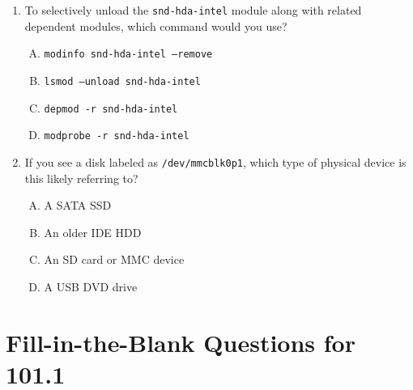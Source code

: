 \documentclass[a4paper]{report}
\begin{document}
\begin{enumerate}[1.]
\item To selectively unload the \texttt{snd-hda-intel} module along with related dependent modules, which command would you use?
  \begin{enumerate}[A)]
    \item \texttt{modinfo snd-hda-intel --remove}
    \item \texttt{lsmod --unload snd-hda-intel}
    \item \texttt{depmod -r snd-hda-intel}
    \item \texttt{modprobe -r snd-hda-intel}
  \end{enumerate}

\item If you see a disk labeled as \texttt{/dev/mmcblk0p1}, which type of physical device is this likely referring to?
  \begin{enumerate}[A)]
    \item A SATA SSD
    \item An older IDE HDD
    \item An SD card or MMC device
    \item A USB DVD drive
  \end{enumerate}
\end{enumerate}

\newpage
\section*{Fill-in-the-Blank Questions for 101.1}
\end{document}
